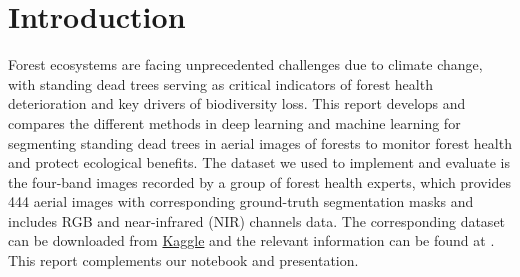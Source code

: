 \section{Introduction}
Forest ecosystems are facing unprecedented challenges due to climate change, with standing dead trees serving as critical indicators of forest health deterioration and key drivers of biodiversity loss. This report develops and compares the different methods in deep learning and machine learning for segmenting standing dead trees in aerial images of forests to monitor forest health and protect ecological benefits. The dataset we used to implement and evaluate is the four-band images recorded by a group of forest health experts, which provides 444 aerial images with corresponding ground-truth segmentation masks and includes RGB and near-infrared (NIR) channels data. The corresponding dataset can be downloaded from \hyperlink{https://www.kaggle.com}{Kaggle} and the relevant information can be found at \cite{b1}. This report complements our notebook and presentation.

